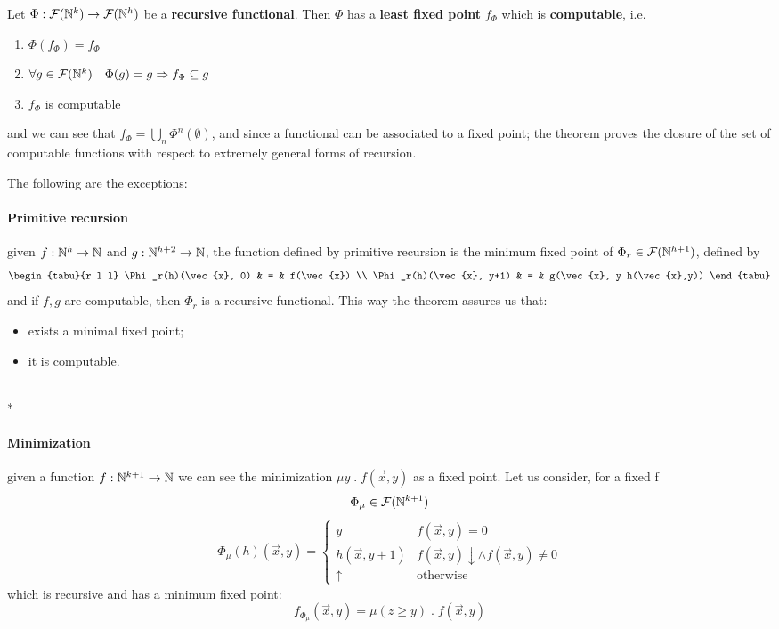 \begin{theorem}\label{th:first-recursion}
  Let $\Phi : \mathcal{F}(\mathbb{N}^k) \to \mathcal{F}(\mathbb{N}^h)$ be
  a \textbf{recursive functional}. Then $\Phi$ has a \textbf{least fixed point}
  $f_\Phi$ which is \textbf{computable}, i.e.
  \begin{enumerate}
  \item $\Phi(f_\Phi) = f_\Phi$
  \item $\forall g \in \mathcal{F}(\mathbb{N}^k) \quad \Phi(g) = g \Rightarrow f_\Phi \subseteq g$
  \item $f_\Phi$ is computable
  \end{enumerate}
  and we can see that $f_\Phi = \bigcup\limits_n
  \Phi^{n}(\emptyset)$, and since a functional can be associated to a
  fixed point; the theorem proves the closure of the set of computable
  functions with respect to extremely general forms of recursion.
\end{theorem}
 The following are the exceptions:
\paragraph{\textbf{Primitive recursion}}
given $f : \mathbb{N}^h \to \mathbb{N}$ and
$g : \mathbb{N}^{h+2} \to \mathbb{N}$, the function defined by primitive
recursion is the minimum fixed point of
$\Phi_r \in \mathcal{F}(\mathbb{N}^{h+1})$, defined by
\[
  \begin{tabu}{r l l}
    \Phi_r(h)(\vec{x}, 0) & = & f(\vec{x}) \\
    \Phi_r(h)(\vec{x}, y+1) & = & g(\vec{x}, y h(\vec{x},y))
  \end{tabu}
\]
and if $f,g$ are computable, then $\Phi_r$ is a recursive
functional. This way the theorem assures us that:
\begin{itemize}
\item exists a minimal fixed point;
\item it is computable.
\end{itemize}

\mbox{}\\*
\paragraph{\textbf{Minimization}}
given a function $f: \mathbb{N}^{k+1} \to \mathbb{N}$ we can see the
minimization $\mu y \; . \; f(\vec{x}, y)$ as a fixed point. Let us
consider, for a fixed f
\[
  \Phi_\mu \in \mathcal{F}(\mathbb{N}^{k+1})
\]
\[
  \Phi_\mu(h)(\vec{x}, y) = \begin{cases}
    y & f(\vec{x},y) = 0 \\
    h(\vec{x}, y+1) & f(\vec{x}, y)\downarrow \land f(\vec{x}, y) \neq 0 \\
    \uparrow & \mbox{otherwise}
  \end{cases}
\]
which is recursive and has a minimum fixed point:
\[
  f_{\Phi_\mu}(\vec{x}, y) = \mu (z \geq y) \; . \; f(\vec{x}, y)
\]

